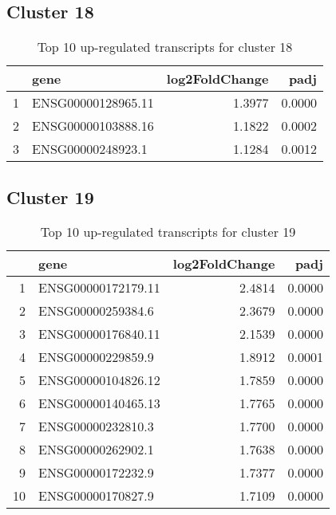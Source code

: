 \documentclass{article}
\begin{document}
\subsection{Cluster 18 }
\begin{table}[H]
\centering
\begin{tabularx}{\textwidth}{rlrr}
  \hline
 & gene & log2FoldChange & padj \\ 
  \hline
1 & ENSG00000128965.11 & 1.3977 & 0.0000 \\ 
  2 & ENSG00000103888.16 & 1.1822 & 0.0002 \\ 
  3 & ENSG00000248923.1 & 1.1284 & 0.0012 \\ 
   \hline
\end{tabularx}
\caption{Top 10 up-regulated transcripts for cluster 18} 
\label{tab:q3_1_18}
\end{table}
\subsection{Cluster 19 }
\begin{table}[H]
\centering
\begin{tabularx}{\textwidth}{rlrr}
  \hline
 & gene & log2FoldChange & padj \\ 
  \hline
1 & ENSG00000172179.11 & 2.4814 & 0.0000 \\ 
  2 & ENSG00000259384.6 & 2.3679 & 0.0000 \\ 
  3 & ENSG00000176840.11 & 2.1539 & 0.0000 \\ 
  4 & ENSG00000229859.9 & 1.8912 & 0.0001 \\ 
  5 & ENSG00000104826.12 & 1.7859 & 0.0000 \\ 
  6 & ENSG00000140465.13 & 1.7765 & 0.0000 \\ 
  7 & ENSG00000232810.3 & 1.7700 & 0.0000 \\ 
  8 & ENSG00000262902.1 & 1.7638 & 0.0000 \\ 
  9 & ENSG00000172232.9 & 1.7377 & 0.0000 \\ 
  10 & ENSG00000170827.9 & 1.7109 & 0.0000 \\ 
   \hline
\end{tabularx}
\caption{Top 10 up-regulated transcripts for cluster 19} 
\label{tab:q3_1_19}
\end{table}
\end{document}
